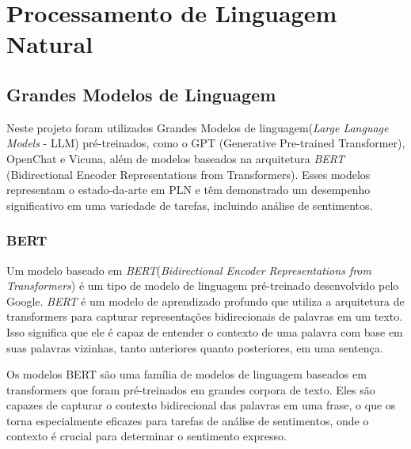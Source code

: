 \section{Processamento de Linguagem Natural}



\subsection{Grandes Modelos de Linguagem}





Neste projeto foram utilizados Grandes Modelos de linguagem(\emph{Large Language Models} - LLM) pré-treinados, como o GPT (Generative Pre-trained Transformer), OpenChat e Vicuna, além de modelos baseados na arquitetura \emph{BERT} (Bidirectional Encoder Representations from Transformers)\cite{hugoZanini2021mediu}. Esses modelos representam o estado-da-arte em PLN e têm demonstrado um desempenho significativo em uma variedade de tarefas, incluindo análise de sentimentos.


\subsubsection[BERT]{BERT}
\label{cap:fund_teorica:sec:modelos:subsec:bert}


Um modelo baseado em \emph{BERT}(\textit{Bidirectional Encoder Representations from Transformers}) é um tipo de modelo de linguagem pré-treinado desenvolvido pelo Google. \emph{BERT} é um modelo de aprendizado profundo que utiliza a arquitetura de transformers para capturar representações bidirecionais de palavras em um texto. Isso significa que ele é capaz de entender o contexto de uma palavra com base em suas palavras vizinhas, tanto anteriores quanto posteriores, em uma sentença.

Os modelos BERT são uma família de modelos de linguagem baseados em transformers que foram pré-treinados em grandes corpora de texto. Eles são capazes de capturar o contexto bidirecional das palavras em uma frase, o que os torna especialmente eficazes para tarefas de análise de sentimentos, onde o contexto é crucial para determinar o sentimento expresso.

